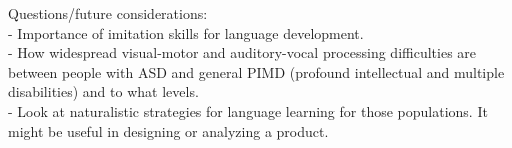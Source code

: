 \documentclass{article}
\begin{document}
	Questions/future considerations:\\
	- Importance of imitation skills for language development.\\
	- How widespread visual-motor and auditory-vocal processing difficulties are between people with ASD and general PIMD (profound intellectual and multiple disabilities) and to what levels.\\
	- Look at naturalistic strategies for language learning for those populations. It might be useful in designing or analyzing a product.\\
	
	
\end{document}
